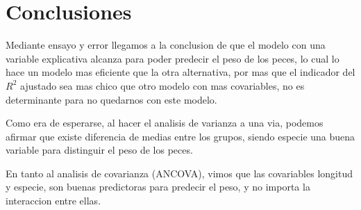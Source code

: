 \documentclass[
]{article}
\begin{document}
\section{Conclusiones}\label{conclusiones}

Mediante ensayo y error llegamos a la conclusion de que el modelo con
una variable explicativa alcanza para poder predecir el peso de los
peces, lo cual lo hace un modelo mas eficiente que la otra alternativa,
por mas que el indicador del \(R^2\) ajustado sea mas chico que otro
modelo con mas covariables, no es determinante para no quedarnos con
este modelo.

Como era de esperarse, al hacer el analisis de varianza a una via,
podemos afirmar que existe diferencia de medias entre los grupos, siendo
especie una buena variable para distinguir el peso de los peces.

En tanto al analisis de covarianza (ANCOVA), vimos que las covariables
longitud y especie, son buenas predictoras para predecir el peso, y no
importa la interaccion entre ellas.
\end{document}
